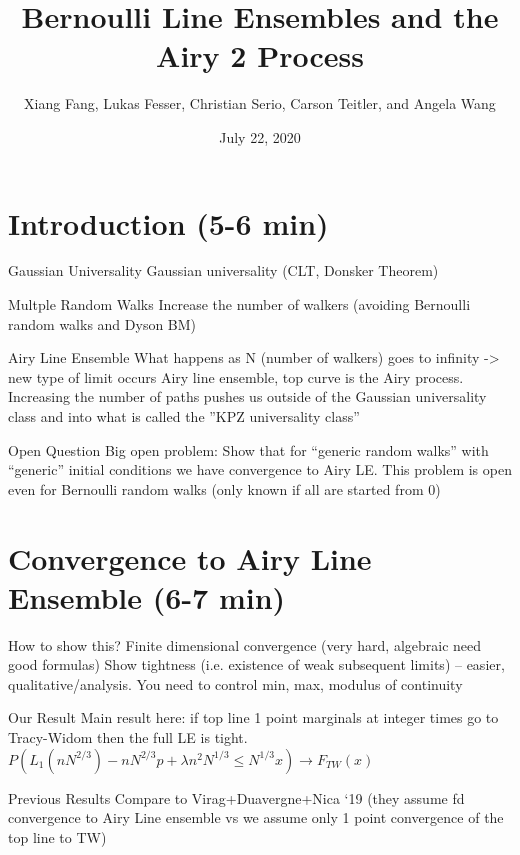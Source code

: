 \documentclass[9pt,t]{beamer}
\title{Bernoulli Line Ensembles and the Airy 2 Process}
\author{Xiang Fang, Lukas Fesser, Christian Serio, Carson Teitler, and Angela Wang}
\institute{Columbia University REU}
\date{July 22, 2020}
\begin{document}
	\begin{frame}
		\maketitle
	\end{frame}
\section{Introduction (5-6 min)}
\begin{frame}{Gaussian Universality}
Gaussian universality (CLT, Donsker Theorem)
\end{frame}
\begin{frame}{Multple Random Walks}
Increase the number of walkers (avoiding Bernoulli random walks and Dyson BM)
\end{frame}
\begin{frame}{Airy Line Ensemble}
What happens as N (number of walkers) goes to infinity -> new type of limit occurs Airy line ensemble, top curve is the Airy process. Increasing the number of paths pushes us outside of the Gaussian universality class and into what is called the ”KPZ universality class”
\end{frame}
\begin{frame}{Open Question}
Big open problem: Show that for “generic random walks” with “generic” initial conditions we have convergence to Airy LE. This problem is open even for Bernoulli random walks (only known if all are started from 0)
\end{frame}

\section{Convergence to Airy Line Ensemble (6-7 min)}
\begin{frame}{How to show this?}
Finite dimensional convergence (very hard, algebraic need good formulas)
Show tightness (i.e. existence of weak subsequent limits) -- easier, qualitative/analysis. You need to control min, max, modulus of continuity
\end{frame}
\begin{frame}{Our Result}
Main result here: if top line 1 point marginals at integer times go to Tracy-Widom then the full LE is tight. 
$P(L_1(nN^{2/3}) - nN^{2/3} p + \lambda n^2 N^{1/3} \leq N^{1/3} x) \to F_{TW}(x)$
\end{frame}
\begin{frame}{Previous Results}
Compare to Virag+Duavergne+Nica ‘19 (they assume fd convergence to Airy Line ensemble vs we assume only 1 point convergence of the top line to TW)
\end{frame}
\end{document}
